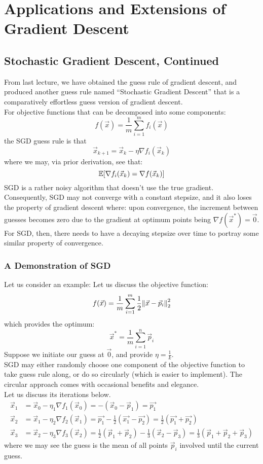 \chapter{Applications and Extensions of Gradient Descent}

\section{Stochastic Gradient Descent, Continued}
From last lecture, we have obtained the guess rule of gradient descent, and produced another guess rule named ``Stochastic Gradient Descent'' that is a comparatively effortless guess version of gradient descent. \\
For objective functions that can be decomposed into some components:
\[
    f(\vec{x}) = \frac{1}{m} \sum_{i = 1}^m f_i (\vec{x})
\]
the SGD guess rule is that
\[
    \vec{x}_{k + 1} = \vec{x}_k - \eta \nabla f_i (\vec{x}_k)
\]
where we may, via prior derivation, see that:
\[
    \E[\nabla f_i (\vec{x}_k) = \nabla f(\vec{x}_k)]
\]
SGD is a rather noisy algorithm that doesn't use the true gradient. \\
Consequently, SGD may not converge with a constant stepsize, and it also loses the property of gradient descent where: upon convergence, the increment between guesses becomes zero due to the gradient at optimum points being $\nabla f(\vec{x}^*) = \vec{0}$.
For SGD, then, there needs to have a decaying stepsize over time to portray some similar property of convergence.

\subsection{A Demonstration of SGD}
Let us consider an example:
    Let us discuss the objective function:
\[
    f(\vec{x}) = \frac{1}{m} \sum_{i = 1}^m \frac{1}{2} \pnorm[2]{\vec{x} - \vec{p}_i}{2}
\]
which provides the optimum:
\[
    \vec{x}^* = \frac{1}{m} \sum_{i = 1}^n \vec{p}_i
\]
Suppose we initiate our guess at $\vec{0}$, and provide $\eta = \frac{1}{k}$. \\
SGD may either randomly choose one component of the objective function to take guess rule along, or do so circularly (which is easier to implement).
The circular approach comes with occasional benefits and elegance. \\
Let us discuss its iterations below.
\begin{align*}
    \vec{x}_1
    &= \vec{x}_0 - \eta_1 \nabla f_1 (\vec{x}_0)
    = - (\vec{x}_0 - \vec{p}_1) = \vec{p_1} \\
    \vec{x}_2
    &= \vec{x}_1 - \eta_2 \nabla f_2 (\vec{x}_1)
    = \vec{p_1} - \frac{1}{2} (\vec{x_1} - \vec{p_2}) = \frac{1}{2} (\vec{p_1} + \vec{p_2}) \\
    \vec{x}_3
    &= \vec{x}_2 - \eta_3 \nabla f_3 (\vec{x}_2)
    = \frac{1}{2} (\vec{p}_1 + \vec{p}_2) - \frac{1}{3} (\vec{x}_2 - \vec{p}_3) = \frac{1}{3} (\vec{p}_1 + \vec{p}_2 + \vec{p}_3)
\end{align*}
where we may see the guess is the mean of all points $\vec{p}_i$ involved until the current guess.

